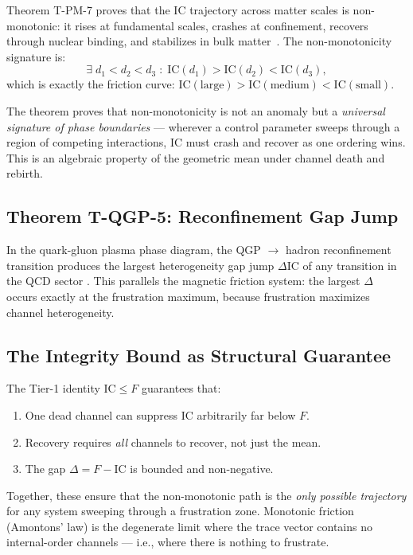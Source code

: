 \documentclass[
  aps,
  prd,
  twocolumn,
  superscriptaddress,
  nofootinbib,
  floatfix
]{revtex4-2}
\newcommand{\beq}{\begin{equation}}
\newcommand{\eeq}{\end{equation}}
\newcommand{\IC}{\mathrm{IC}}
\begin{document}
Theorem T-PM-7 proves that the $\IC$ trajectory across
matter scales is non-monotonic: it rises at fundamental
scales, crashes at confinement, recovers through nuclear
binding, and stabilizes in bulk
matter~\cite{paulus2025physicscoherence}.
The non-monotonicity signature is:
\beq\label{eq:nonmono}
  \exists\; d_1 < d_2 < d_3 \;:\;
  \IC(d_1) > \IC(d_2) < \IC(d_3),
\eeq
which is exactly the friction curve: $\IC(\text{large}) >
\IC(\text{medium}) < \IC(\text{small})$.

The theorem proves that non-monotonicity is not an
anomaly but a \emph{universal signature of phase
boundaries} --- wherever a control parameter sweeps
through a region of competing interactions, $\IC$ must
crash and recover as one ordering wins.  This is an
algebraic property of the geometric mean under channel
death and rebirth.

\subsection{Theorem T-QGP-5: Reconfinement Gap Jump}

In the quark-gluon plasma phase diagram, the QGP
$\to$ hadron reconfinement transition produces the
largest heterogeneity gap jump $\Delta\IC$ of any
transition in the QCD sector \cite{paulus2026spacetimememory}.
This parallels the magnetic friction system:
the largest $\Delta$ occurs exactly at the frustration
maximum, because frustration maximizes channel
heterogeneity.

\subsection{The Integrity Bound as Structural Guarantee}

The Tier-1 identity $\IC \leq F$ guarantees that:
\begin{enumerate}[nosep]
  \item One dead channel can suppress $\IC$ arbitrarily
    far below $F$.
  \item Recovery requires \emph{all} channels to
    recover, not just the mean.
  \item The gap $\Delta = F - \IC$ is bounded and
    non-negative.
\end{enumerate}
Together, these ensure that the non-monotonic path is
the \emph{only possible trajectory} for any system
sweeping through a frustration zone.  Monotonic
friction (Amontons' law) is the degenerate limit
where the trace vector contains no internal-order channels
--- i.e., where there is nothing to frustrate.
\end{document}
